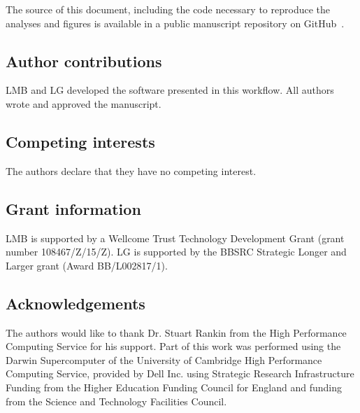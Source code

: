 The source of this document, including the code necessary to reproduce
the analyses and figures is available in a public manuscript
repository on GitHub~\cite{ghrepo}.

\bigskip

\subsection*{Author contributions}

LMB and LG developed the software presented in this workflow. All
authors wrote and approved the manuscript.

\subsection*{Competing interests}

The authors declare that they have no competing interest. 

\subsection*{Grant information}

LMB is supported by a Wellcome Trust Technology Development Grant
(grant number 108467/Z/15/Z). LG is supported by the BBSRC Strategic
Longer and Larger grant (Award BB/L002817/1).


\subsection*{Acknowledgements}

The authors would like to thank Dr. Stuart Rankin from the High
Performance Computing Service for his support. Part of this work was
performed using the Darwin Supercomputer of the University of
Cambridge High Performance Computing Service, provided by Dell
Inc. using Strategic Research Infrastructure Funding from the Higher
Education Funding Council for England and funding from the Science and
Technology Facilities Council.
